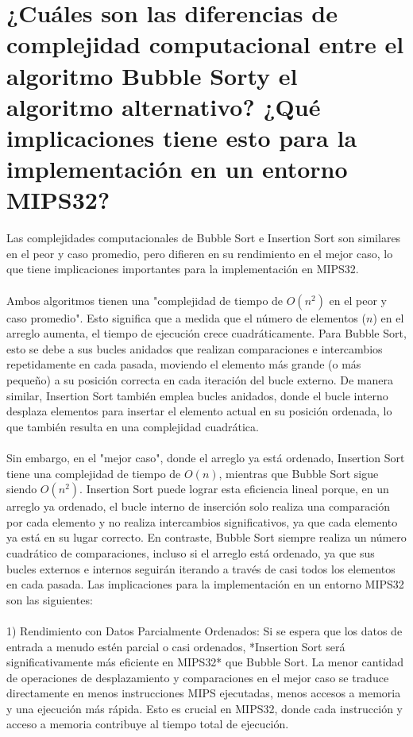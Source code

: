 \documentclass{article}
\begin{document}
\section{¿Cuáles son las diferencias de complejidad computacional entre el algoritmo Bubble Sorty el algoritmo alternativo? ¿Qué implicaciones tiene esto para la implementación en un entorno MIPS32?}
Las complejidades computacionales de Bubble Sort e Insertion Sort son similares en el peor y caso promedio, pero difieren en su rendimiento en el mejor caso, lo que tiene implicaciones importantes para la implementación en MIPS32.
\\
\\Ambos algoritmos tienen una "complejidad de tiempo de $O(n^2)$ en el peor y caso promedio". Esto significa que a medida que el número de elementos ($n$) en el arreglo aumenta, el tiempo de ejecución crece cuadráticamente. Para Bubble Sort, esto se debe a sus bucles anidados que realizan comparaciones e intercambios repetidamente en cada pasada, moviendo el elemento más grande (o más pequeño) a su posición correcta en cada iteración del bucle externo. De manera similar, Insertion Sort también emplea bucles anidados, donde el bucle interno desplaza elementos para insertar el elemento actual en su posición ordenada, lo que también resulta en una complejidad cuadrática.
\\
\\Sin embargo, en el "mejor caso", donde el arreglo ya está ordenado, Insertion Sort tiene una complejidad de tiempo de $O(n)$, mientras que Bubble Sort sigue siendo $O(n^2)$. Insertion Sort puede lograr esta eficiencia lineal porque, en un arreglo ya ordenado, el bucle interno de inserción solo realiza una comparación por cada elemento y no realiza intercambios significativos, ya que cada elemento ya está en su lugar correcto. En contraste, Bubble Sort siempre realiza un número cuadrático de comparaciones, incluso si el arreglo está ordenado, ya que sus bucles externos e internos seguirán iterando a través de casi todos los elementos en cada pasada.
Las implicaciones para la implementación en un entorno MIPS32 son las siguientes:
\\
\\1) Rendimiento con Datos Parcialmente Ordenados: Si se espera que los datos de entrada a menudo estén parcial o casi ordenados, *Insertion Sort será significativamente más eficiente en MIPS32* que Bubble Sort. La menor cantidad de operaciones de desplazamiento y comparaciones en el mejor caso se traduce directamente en menos instrucciones MIPS ejecutadas, menos accesos a memoria y una ejecución más rápida. Esto es crucial en MIPS32, donde cada instrucción y acceso a memoria contribuye al tiempo total de ejecución.
\end{document}
